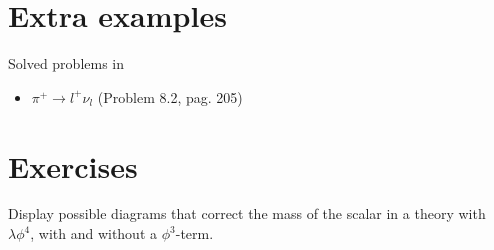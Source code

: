 \section{Extra examples}
Solved problems in~\cite{Maggiore:2005qv} 
\begin{itemize}
\item  $\pi^+\to l^+\nu_l $ (Problem 8.2, pag. 205)
\end{itemize}

\section{Exercises}
Display possible diagrams that correct the mass of the scalar in a theory with $\lambda \phi^4$, with and without a $\phi^3$-term.





